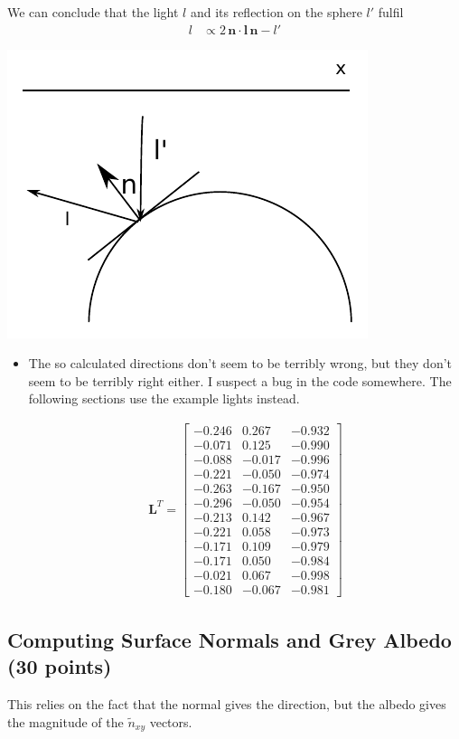 \documentclass{paper}
\begin{document}
We can conclude that the light $l$ and its reflection on the sphere $l'$ fulfil
\begin{align*}
l&\propto 2\,\mathbf{n}\cdot \mathbf{l}\, \mathbf{n} - l'
\end{align*}
\begin{center}
\includegraphics[width=0.5\linewidth]{out/reflection.pdf}
\end{center}
\begin{itemize}
\item The so calculated directions don't seem to be terribly wrong, but they don't seem to be terribly right either. I suspect a bug in the code somewhere. The following sections use the example lights instead.

\begin{align}
\mathbf{L}^T= \left[ \begin{array}{ccc}
-0.246&0.267&-0.932\\
-0.071&0.125&-0.990\\
-0.088&-0.017&-0.996\\
-0.221&-0.050&-0.974\\
-0.263&-0.167&-0.950\\
-0.296&-0.050&-0.954\\
-0.213&0.142&-0.967\\
-0.221&0.058&-0.973\\
-0.171&0.109&-0.979\\
-0.171&0.050&-0.984\\
-0.021&0.067&-0.998\\
-0.180&-0.067&-0.981
\end{array} \right] \nonumber
\end{align}
\end{itemize}


\subsection{Computing Surface Normals and Grey Albedo (30 points)}
This relies on the fact that the normal gives the direction, but the albedo gives the magnitude of the $\tilde{n}_{xy}$ vectors.
\end{document}

